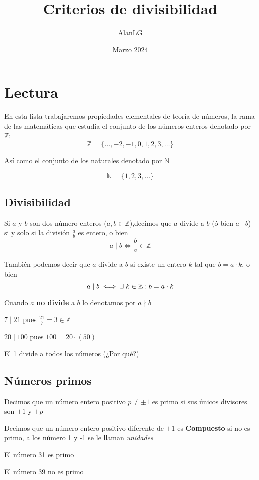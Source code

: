 \documentclass[11pt]{scrartcl}
\title{Criterios de divisibilidad}
\author{AlanLG}
\date{Marzo 2024}
\begin{document}
\maketitle

\section{Lectura}
En esta lista trabajaremos propiedades elementales de teoría de números, la rama de las matemáticas que estudia el conjunto de los números enteros denotado por $\mathbb{Z}$:
\[\mathbb{Z}=\{\ldots,-2,-1,0,1,2,3,\ldots\}\]

Así como el conjunto de los naturales denotado por $\mathbb{N}$

\[\mathbb{N}=\{1,2,3,\ldots\}\]


\subsection{Divisibilidad}
Si $a$ y $b$ son dos número enteros ($a,b\in\mathbb{Z}$),decimos que $a$ divide a $b$ (ó bien $a\mid b$) si y solo si la división $\frac{a}{b}$ es entero, o bien
\[a\mid b \iff \frac{b}{a}\in \mathbb{Z}\]

También podemos decir que $a$ divide a $b$ si existe un entero $k$ tal que $b=a\cdot k$, o bien
\[a\mid b \iff \exists\hspace{0.1cm} k\in\mathbb{Z} : b=a\cdot k\]

Cuando $a$ \textbf{no divide} a $b$ lo denotamos por $a\nmid b$

\begin{ejemplo*}
    $7\mid 21$ pues $\frac{21}{7}=3\in \mathbb{Z}$
\end{ejemplo*}
\begin{ejemplo*}
    $20\mid 100$ pues $100=20\cdot(50)$
\end{ejemplo*}
\begin{ejemplo*}
    El 1 divide a todos los números (¿Por qué?)
\end{ejemplo*}
\subsection{Números primos}

\begin{proposition*}
    Decimos que un número entero positivo $p\neq \pm 1$ es primo si sus únicos divisores son $\pm1$ y $\pm p$
\end{proposition*}
\begin{definition*}
    Decimos que un número entero positivo diferente de $\pm 1$ es \textbf{Compuesto} si no es primo, a los número 1 y -1 se le llaman \textit{unidades}
\end{definition*}
\begin{ejemplo*}
    El número 31 es primo
\end{ejemplo*}
\begin{ejemplo*}
    El número 39 no es primo
\end{ejemplo*}
\end{document}
